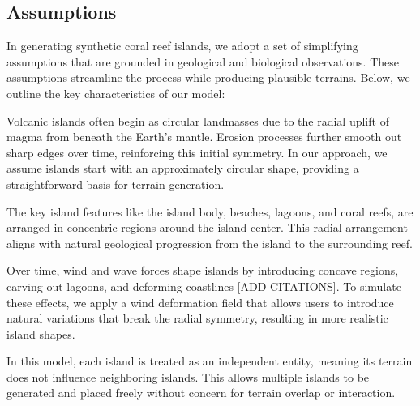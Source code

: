 \subsection{Assumptions}
In generating synthetic coral reef islands, we adopt a set of simplifying assumptions that are grounded in geological and biological observations. These assumptions streamline the process while producing plausible terrains. Below, we outline the key characteristics of our model:

\begin{Itemize}
     Volcanic islands often begin as circular landmasses due to the radial uplift of magma from beneath the Earth's mantle. Erosion processes further smooth out sharp edges over time, reinforcing this initial symmetry. In our approach, we assume islands start with an approximately circular shape, providing a straightforward basis for terrain generation.

     The key island features like the island body, beaches, lagoons, and coral reefs, are arranged in concentric regions around the island center. This radial arrangement aligns with natural geological progression from the island to the surrounding reef.

     Over time, wind and wave forces shape islands by introducing concave regions, carving out lagoons, and deforming coastlines [ADD CITATIONS]. To simulate these effects, we apply a wind deformation field that allows users to introduce natural variations that break the radial symmetry, resulting in more realistic island shapes.

     In this model, each island is treated as an independent entity, meaning its terrain does not influence neighboring islands. This allows multiple islands to be generated and placed freely without concern for terrain overlap or interaction. 


\end{Itemize}
